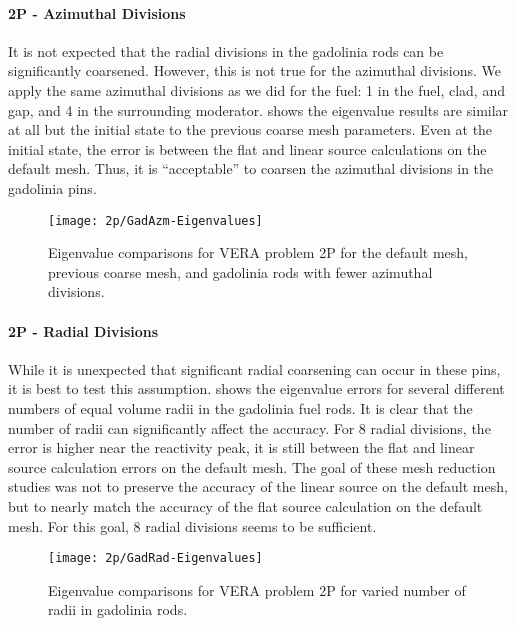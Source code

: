 {{{{        \paragraph{2P - Azimuthal Divisions}{
          It is not expected that the radial divisions in the gadolinia rods can be significantly coarsened.
          However, this is not true for the azimuthal divisions.
          We apply the same azimuthal divisions as we did for the fuel: 1 in the fuel, clad, and gap, and 4 in the surrounding moderator.
           shows the eigenvalue results are similar at all but the initial state to the previous coarse mesh parameters.
          Even at the initial state, the error is between the flat and linear source calculations on the default mesh.
          Thus, it is ``acceptable'' to coarsen the azimuthal divisions in the gadolinia pins.

          \begin{figure}
            \centering
            \texttt{[image: 2p/GadAzm-Eigenvalues]}
            \caption{Eigenvalue comparisons for VERA problem 2P for the default mesh, previous coarse mesh, and gadolinia rods with fewer azimuthal divisions.\label{fig:LSMOC:2P:Gad Azm:Eigenvalues}}
          \end{figure}
        }
        \paragraph{2P - Radial Divisions}{
          While it is unexpected that significant radial coarsening can occur in these pins, it is best to test this assumption.
           shows the eigenvalue errors for several different numbers of equal volume radii in the gadolinia fuel rods.
          It is clear that the number of radii can significantly affect the accuracy.
          For 8 radial divisions, the error is higher near the reactivity peak, it is still between the flat and linear source calculation errors on the default mesh.
          The goal of these mesh reduction studies was not to preserve the accuracy of the linear source on the default mesh, but to nearly match the accuracy of the flat source calculation on the default mesh.
          For this goal, 8 radial divisions seems to be sufficient.

          \begin{figure}
              \centering
              \texttt{[image: 2p/GadRad-Eigenvalues]}
              \caption{Eigenvalue comparisons for VERA problem 2P for varied number of radii in gadolinia rods.\label{fig:LSMOC:2P:Gad Rad:Eigenvalues}}
          \end{figure}
        }
}}}}
